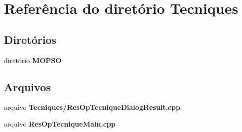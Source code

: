 \section{Referência do diretório Tecniques}
\label{dir_1a1faed61083fe76f7e6dbdaef5bcce9}
\subsection*{Diretórios}
\begin{DoxyCompactItemize}
\item 
diretório {\bf M\+O\+P\+SO}
\end{DoxyCompactItemize}
\subsection*{Arquivos}
\begin{DoxyCompactItemize}
\item 
arquivo {\bf Tecniques/\+Res\+Op\+Tecnique\+Dialog\+Result.\+cpp}
\item 
arquivo {\bf Res\+Op\+Tecnique\+Main.\+cpp}
\end{DoxyCompactItemize}

